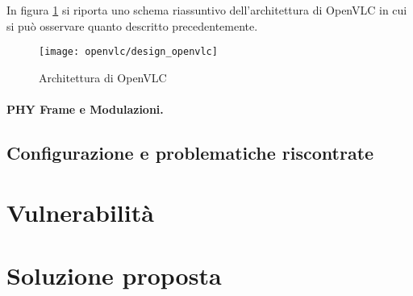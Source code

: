 In figura \ref{fig:design_openvlc} si riporta uno schema riassuntivo dell'architettura di OpenVLC in cui si può osservare quanto descritto precedentemente.
\begin{figure}[H] 
    \centering 
    \texttt{[image: openvlc/design\_openvlc]}
    \caption{Architettura di OpenVLC}
    \label{fig:design_openvlc}
\end{figure}

\paragraph{PHY Frame e Modulazioni.}



















\subsection{Configurazione e problematiche riscontrate}


\section{Vulnerabilità}

\section{Soluzione proposta}

